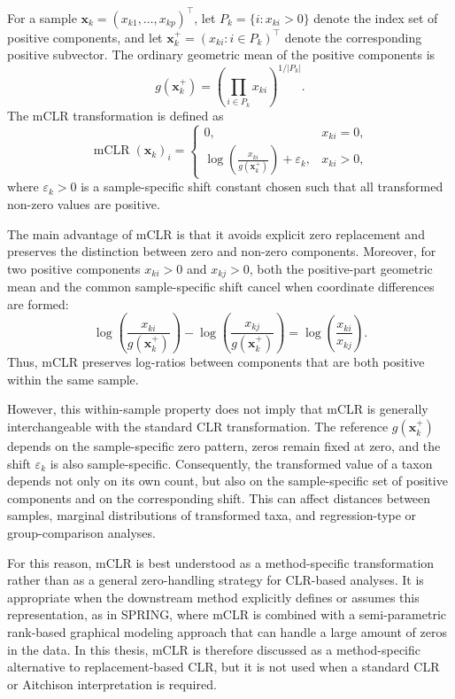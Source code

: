 For a sample $\mathbf{x}_k=(x_{k1},\ldots,x_{kp})^\top$, let $P_k=\{i:x_{ki}>0\}$ denote the index set of positive components, and let $\mathbf{x}_k^+=(x_{ki}:i\in P_k)^\top$ denote the corresponding positive subvector. The ordinary geometric mean of the positive components is
\begin{equation}
g(\mathbf{x}_k^+)=\left(\prod_{i\in P_k}x_{ki}\right)^{1/|P_k|}.
\label{eq:2micro:positive_geometric_mean}
\end{equation}
The mCLR transformation is defined as
\begin{equation}
\operatorname{mCLR}(\mathbf{x}_k)_i=
\begin{cases}
0, & x_{ki}=0,\\
\log\left(\frac{x_{ki}}{g(\mathbf{x}_k^+)}\right)+\varepsilon_k, & x_{ki}>0,
\end{cases}
\label{eq:2micro:mclr}
\end{equation}
where $\varepsilon_k>0$ is a sample-specific shift constant chosen such that all transformed non-zero values are positive.

The main advantage of mCLR is that it avoids explicit zero replacement and preserves the distinction between zero and non-zero components. Moreover, for two positive components $x_{ki}>0$ and $x_{kj}>0$, both the positive-part geometric mean and the common sample-specific shift cancel when coordinate differences are formed:
\begin{equation}
\log\left(\frac{x_{ki}}{g(\mathbf{x}_k^+)}\right)
-
\log\left(\frac{x_{kj}}{g(\mathbf{x}_k^+)}\right)
=
\log\left(\frac{x_{ki}}{x_{kj}}\right).
\label{eq:2micro:mclr_positive_logratio}
\end{equation}
Thus, mCLR preserves log-ratios between components that are both positive within the same sample.

However, this within-sample property does not imply that mCLR is generally interchangeable with the standard CLR transformation. The reference $g(\mathbf{x}_k^+)$ depends on the sample-specific zero pattern, zeros remain fixed at zero, and the shift $\varepsilon_k$ is also sample-specific. Consequently, the transformed value of a taxon depends not only on its own count, but also on the sample-specific set of positive components and on the corresponding shift. This can affect distances between samples, marginal distributions of transformed taxa, and regression-type or group-comparison analyses.

For this reason, mCLR is best understood as a method-specific transformation rather than as a general zero-handling strategy for CLR-based analyses. It is appropriate when the downstream method explicitly defines or assumes this representation, as in SPRING, where mCLR is combined with a semi-parametric rank-based graphical modeling approach that can handle a large amount of zeros in the data. In this thesis, mCLR is therefore discussed as a method-specific alternative to replacement-based CLR, but it is not used when a standard CLR or Aitchison interpretation is required.

